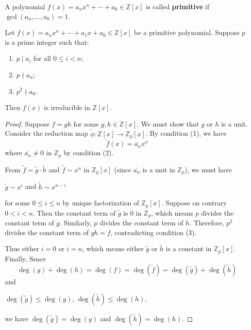 {\begin{definition}
A polynomial $f(x) = a_n x^n + \cdots + a_0 \in \mathbb{Z}[x]$ is called \textbf{primitive} if $\gcd(a_n, \ldots, a_0) = 1$.
\end{definition}


\begin{theorem}
Let $f(x) = a_n x^n + \cdots + a_1 x + a_0 \in \mathbb{Z}[x]$ be a primitive polynomial. Suppose $p$ is a prime integer such that:
\begin{enumerate}
    \item[(1)] $p \mid a_i$ for all $0 \le i < n$;
    \item[(2)] $p \nmid a_n$;
    \item[(3)] $p^2 \nmid a_0$.
\end{enumerate}
Then $f(x)$ is irreducible in $\mathbb{Z}[x]$.
\end{theorem}

\begin{proof}
Suppose $f = gh$ for some $g, h \in \mathbb{Z}[x]$. We must show that $g$ or $h$ is a unit. Consider the reduction map $\tilde{\phi}: \mathbb{Z}[x] \to \mathbb{Z}_p[x]$. By condition (1), we have 
\[
\tilde{f}(x) = \overline{a_n} x^n
\]
where $\overline{a_n} \neq 0$ in $\mathbb{Z}_p$ by condition (2).

From $\tilde{f} = \tilde{g} \cdot \tilde{h}$ and $\tilde{f} \sim x^n$ in $\mathbb{Z}_p[x]$ (since $\overline{a_n}$ is a unit in $\mathbb{Z}_p$), we must have 
\begin{center}
$\tilde{g} \sim x^i$ and $\tilde{h} \sim x^{n-i}$
\end{center}
for some $0 \le i \le n$ by unique factorization of $\mathbb{Z}_p[x]$. Suppose on contrary $0 < i < n$. Then the constant term of $\tilde{g}$ is $0$ in $\mathbb{Z}_p$, which means $p$ divides the constant term of $g$. Similarly, $p$ divides the constant term of $h$. Therefore, $p^2$ divides the constant term of $gh = f$, contradicting condition (3).

Thus either $i = 0$ or $i = n$, which means either $\tilde{g}$ or $\tilde{h}$ is a constant in $\mathbb{Z}_p[x]$. Finally, Ssnce 
$$\deg(g) + \deg(h) = \deg(f) = \deg(\tilde{f}) = \deg(\tilde{g}) + \deg(\tilde{h})$$ 
and 
\begin{center}
$\deg(\tilde{g}) \le \deg(g)$, $\deg(\tilde{h}) \le \deg(h)$, 
\end{center}
we have $\deg(\tilde{g}) = \deg(g)$ and $\deg(\tilde{h}) = \deg(h)$.


\end{proof}}
